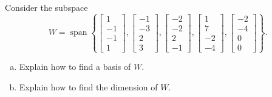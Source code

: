 
\begin{exerciseStatement}


Consider the subspace \[W=\operatorname{span}  \left\{ \left[\begin{array}{c}
1 \\
-1 \\
-1 \\
1
\end{array}\right] , \left[\begin{array}{c}
-1 \\
-3 \\
2 \\
3
\end{array}\right] , \left[\begin{array}{c}
-2 \\
-2 \\
2 \\
-1
\end{array}\right] , \left[\begin{array}{c}
1 \\
7 \\
-2 \\
-4
\end{array}\right] , \left[\begin{array}{c}
-2 \\
-4 \\
0 \\
0
\end{array}\right] \right\} .\]


\begin{enumerate}[(a)]
\item  Explain how to find a basis of \(W\).
\item  Explain how to find the dimension of \(W\).
\end{enumerate}
    
\end{exerciseStatement}
    
